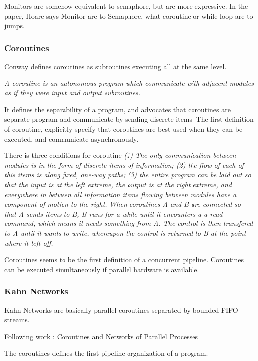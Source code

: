 Monitors are somehow equivalent to semaphore, but are more expressive.
In the paper, Hoare says Monitor are to Semaphore, what coroutine or while loop are to jumps.


\subsubsection{Coroutines}

Conway defines coroutines as subroutines executing all at the same level.\cite{Conway1963}

\textit{A coroutine is an autonomous program which communicate with adjacent modules as if they were input and output subroutines.}

It defines the separability of a program, and advocates that coroutines are separate program and communicate by sending discrete items.
The first definition of coroutine, explicitly specify that coroutines are best used when they can be executed, and communicate asynchronously.

There is three conditions for coroutine
\textit{(1) The only communication between modules is in the form of discrete items of information; (2) the flow of each of this items is along fixed, one-way paths; (3) the entire program can be laid out so that the input is at the left extreme, the output is at the right extreme, and everywhere in between all information items flowing between modules have a component of motion to the right.}
\textit{When coroutines A and B are connected so that A sends items to B, B runs for a while until it encounters a a read command, which means it needs something from A. The control is then transfered to A until it wants to write, whereupon the control is returned to B at the point where it left off.}

Coroutines seems to be the first definition of a concurrent pipeline.
Coroutines can be executed simultaneously if parallel hardware is available.

\subsubsection{Kahn Networks}

Kahn Networks are basically parallel coroutines separated by bounded FIFO streams.



Following work : Coroutines and Networks of Parallel Processes\cite{Kahn1976}

The coroutines defines the first pipeline organization of a program.


